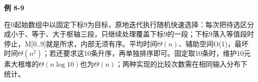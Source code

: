{\color{ink}\bfseries 例 8-9}\par\vspace{1bp}在0起始数组中以固定下标9为目标，原地迭代执行随机快速选择：每次把待选区分成小于、等于、大于枢轴三段，只继续处理覆盖下标9的一段；下标9落入等值段时停止，M[0..9]就是所求，内部无须有序。平均时间\(\Theta (n)\)、辅助空间O(1)，最坏时间\(\Theta (n^{2})\)；若还要求这10条升序，再单独排序即可。固定取10条时，维护10元素大根堆的\(\Theta (n \operatorname{log} 10)\)也为\(\Theta (n)\)；两种实现的比较次数需在相同输入分布下统计。
